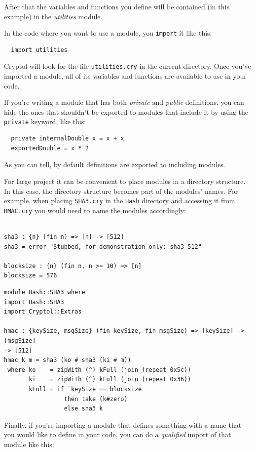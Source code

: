 After that the variables and functions you define will be contained
(in this example) in the {\it utilities} module.

In the code where you want to use a module, you \verb+import+ it like this:
\begin{verbatim}
  import utilities
\end{verbatim}

Cryptol will look for the file \verb+utilities.cry+ in the current directory. Once you've imported a module, all of its variables and functions are available to use in your code.

If you're writing a module that has both {\it private} and {\it public}
definitions, you can hide the ones that shouldn't be exported to modules
that include it by using the \verb+private+ keyword, like this:\indPrivate

\begin{verbatim}
  private internalDouble x = x + x
  exportedDouble = x * 2
\end{verbatim}

As you can tell, by default definitions are exported to including modules.

For large project it can be convenient to place modules in a directory
structure.  In this case, the directory structure becomes part of the modules'
names.  For example, when placing \verb+SHA3.cry+ in the \verb+Hash+ directory and
accessing it from \verb+HMAC.cry+ you would need to name the modules
accordingly:

\begin{verbatim}

sha3 : {n} (fin n) => [n] -> [512]
sha3 = error "Stubbed, for demonstration only: sha3-512"

blocksize : {n} (fin n, n >= 10) => [n]
blocksize = 576
\end{verbatim}

\begin{verbatim}
module Hash::SHA3 where
import Hash::SHA3
import Cryptol::Extras

hmac : {keySize, msgSize} (fin keySize, fin msgSize) => [keySize] -> [msgSize]
-> [512]
hmac k m = sha3 (ko # sha3 (ki # m))
 where ko    = zipWith (^) kFull (join (repeat 0x5c))
       ki    = zipWith (^) kFull (join (repeat 0x36))
       kFull = if `keySize == blocksize
                 then take (k#zero)
                 else sha3 k
\end{verbatim}

Finally, if you're importing a module that defines something with
a name that you would like to define in your code, you can do a
{\it qualified} import of that module like this:

